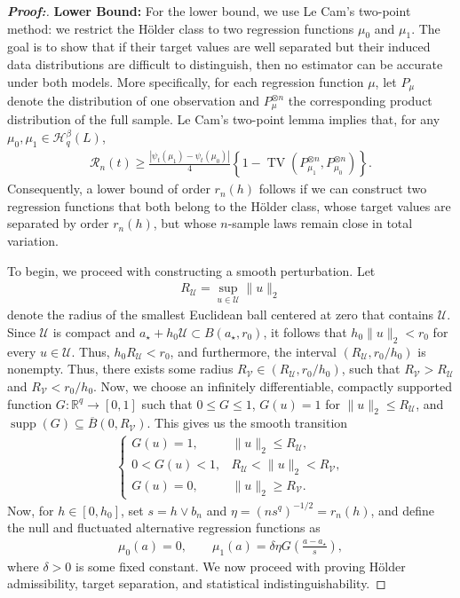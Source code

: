 \documentclass[11pt,twoside]{article}
\theoremstyle{definition}
\theoremstyle{remark}
\begin{document}
\begin{proof}[\textbf{Proof:}]
\textbf{Lower Bound:} For the lower bound, we use Le Cam's two-point method: we restrict the H\"older class to two regression functions $\mu_0$ and $\mu_1$. The goal is to show that if their target values are well separated but their induced data distributions are difficult to distinguish, then no estimator can be accurate under both models. More specifically, for each regression function $\mu$, let $P_\mu$ denote the distribution of one observation and $P_\mu^{\otimes n}$ the corresponding product distribution of the full sample. Le Cam's two-point lemma \citep{tsbakov2009} implies that, for any $\mu_0,\mu_1\in\mathcal{H}_q^\beta(L)$,
\begin{align*}
    \mathcal{R}_n(t) \geq \frac{|\psi_t(\mu_1)-\psi_t(\mu_0)|}{4} \left\{ 1- \operatorname{TV}\!\left( P_{\mu_1}^{\otimes n}, P_{\mu_0}^{\otimes n} \right) \right\}.
\end{align*}
Consequently, a lower bound of order $r_n(h)$ follows if we can
construct two regression functions that both belong to the H\"older class, whose target values are separated by order $r_n(h)$, but whose $n$-sample laws remain close in total variation. \medskip 




To begin, we proceed with constructing a smooth perturbation. Let
\begin{align*}
    R_{\mathcal{U}} = \sup_{u\in\mathcal{U}}\|u\|_2
\end{align*}
denote the radius of the smallest Euclidean ball centered at zero that contains $\mathcal{U}$. Since $\mathcal{U}$ is compact and $a_\star+h_0\mathcal{U}\subset B(a_\star,r_0)$, it follows that $h_0 \|u \|_2 < r_0$ for every $u \in \mathcal{U}$. Thus, $h_0 R_{\mathcal{U}} < r_0$, and furthermore, the interval $(R_{\mathcal{U}}, r_0 / h_0)$ is nonempty. Thus, there exists some radius $R_{\mathcal{V}} \in (R_{\mathcal{U}}, r_0 / h_0)$, such that $R_{\mathcal{V}} > R_{\mathcal{U}}$ and $R_{\mathcal{V}} < r_0 / h_0$. Now, we choose an infinitely differentiable, compactly supported function $G:\mathbb{R}^q \to [0,1]$ such that $0\leq G\leq1$, $ G(u)=1$ for $\|u\|_2\leq R_{\mathcal{U}}$, and $\operatorname{supp}(G) \subseteq \overline{B}(0,R_{\mathcal{V}})$. This gives us the smooth transition
\begin{align} \label{smooth_transition}
    \begin{cases}
G(u)=1, & \|u\|_2\leq R_{\mathcal{U}},\\
0<G(u)<1, & R_{\mathcal{U}} < \|u\|_2<R_{\mathcal{V}},\\
G(u)=0, & \|u\|_2\geq R_{\mathcal{V}}.
\end{cases}
\end{align}
Now, for $h\in[0,h_0]$, set $s=h\vee b_n$ and $\eta=(ns^q)^{-1/2} = r_n(h)$, and define the null and fluctuated alternative regression functions as
\begin{align*}
      \mu_0(a)=0, \qquad \mu_1(a) = \delta\eta G\!\left(\frac{a-a_\star}{s}\right),
\end{align*}
where $\delta > 0$ is some fixed constant. We now proceed with proving H\"older admissibility, target separation, and statistical indistinguishability. \medskip


\end{proof}
\end{document}
